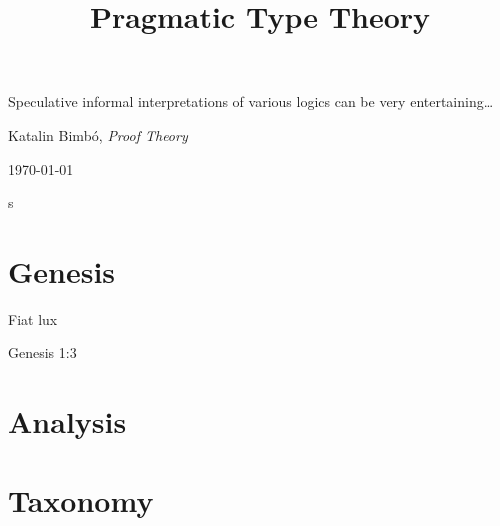 \documentclass[12pt,book]{memoir}
\begin{document}
\nocite{*}
\title{Pragmatic Type Theory}
\date{}
\titlingpageend{\clearpage}{\clearpage}
\begin{titlingpage}
  \maketitle
\epigraph{Speculative informal interpretations of various logics can be very entertaining\ldots}{Katalin Bimbó, \textit{Proof Theory} \parencite{bimbo2014proof}}
\end{titlingpage}

\today
\newpage

\hypertarget{toc}{s}
\tableofcontents*

\mainmatter

\nopartblankpage
\makeatletter
\renewcommand*{\afterpartskip}{\par\vskip2ex
\@afterindentfalse} %
\makeatother

\part{Genesis}
\epigraph{Fiat lux}
         {Genesis 1:3}
\newpage






\part{Analysis}





\part{Taxonomy}







\end{document}
